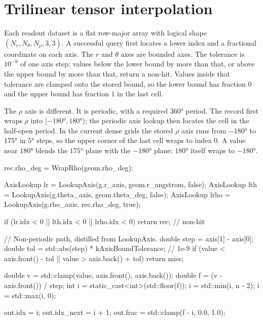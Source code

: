 \documentclass[11pt]{article}
\begin{document}
\section{Trilinear tensor interpolation}

Each readout dataset is a flat row-major array with logical shape
\((N_r,N_\theta,N_\rho,3,3)\). A successful query first locates a lower index
and a fractional coordinate on each axis. The \(r\) and \(\theta\) axes are
bounded axes. The tolerance is \(10^{-9}\) of one axis step: values below the
lower bound by more than that, or above the upper bound by more than that,
return a non-hit. Values inside that tolerance are clamped onto the stored
bound, so the lower bound has fraction \(0\) and the upper bound has fraction
\(1\) in the last cell.

The \(\rho\) axis is different. It is periodic, with a required
\(\ang{360}\) period. The record first wraps \(\rho\) into
\([-\ang{180},\ang{180})\); the periodic axis lookup then locates the cell in
the half-open period. In the current dense grids the stored \(\rho\) axis
runs from \(-\ang{180}\) to \(\ang{175}\) in \(\ang{5}\) steps, so the upper
corner of the last cell wraps to index \(0\). A value near
\(\ang{180}\) blends the \(\ang{175}\) plane with the \(-\ang{180}\) plane;
\(\ang{180}\) itself wraps to \(-\ang{180}\).

\begin{codebox}
rec.rho_deg = WrapRho(geom.rho_deg);

AxisLookup lr =
    LookupAxis(g.r_axis,     geom.r_angstrom, false);
AxisLookup lth =
    LookupAxis(g.theta_axis, geom.theta_deg,  false);
AxisLookup lrho =
    LookupAxis(g.rho_axis,   rec.rho_deg,     true);

if (lr.idx < 0 || lth.idx < 0 || lrho.idx < 0)
    return rec;                              // non-hit
\end{codebox}

\begin{codebox}
// Non-periodic path, distilled from LookupAxis.
double step = axis[1] - axis[0];
double tol  = std::abs(step) * kAxisBoundTolerance;  // 1e-9
if (value < axis.front() - tol || value > axis.back() + tol)
    return miss;

double v = std::clamp(value, axis.front(), axis.back());
double f = (v - axis.front()) / step;
int i = static_cast<int>(std::floor(f));
i = std::min(i, n - 2);
i = std::max(i, 0);

out.idx      = i;
out.idx_next = i + 1;
out.frac     = std::clamp(f - i, 0.0, 1.0);
\end{codebox}
\end{document}

